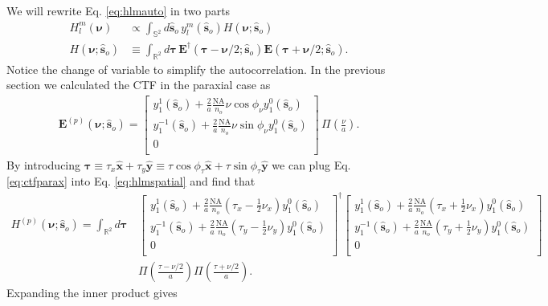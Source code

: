 \documentclass[11pt]{article}
\providecommand{\mb}[1]{\mathbf{#1}}
\providecommand{\so}[1]{\mathbf{\hat{s}}_o}
\providecommand{\mh}[1]{\mathbf{\hat{#1}}}
\providecommand{\bs}[1]{\boldsymbol{#1}}
\begin{document}
We will rewrite Eq. \ref{eq:hlmauto} in two parts
\begin{align}
  H_l^m(\bs{\nu}) &\propto \int_{\mathbb{S}^2}d\so{}\, y_l^m(\so{}) H(\bs{\nu}; \so{})  \label{eq:hlmauto2}\\
  H(\bs{\nu}; \so{}) &\equiv \int_{\mathbb{R}^2}d\bs{\tau}\,\mb{E}^{\dagger}(\bs{\tau}- \bs{\nu}/2; \so{})\mb{E}(\bs{\tau} + \bs{\nu}/2; \so{}). \label{eq:hlmspatial}
\end{align}
Notice the change of variable to simplify the autocorrelation. In the previous
section we calculated the CTF in the paraxial case as 
\begin{align}
  {\mb{E}}^{(p)}(\bs{\nu}; \so{}) =
\begin{bmatrix}
  y_1^1(\so{}) + \frac{2}{a}\frac{\text{NA}}{n_o}\nu\cos\phi_\nu y_1^0(\so{})\\
  y_1^{-1}(\so{}) + \frac{2}{a}\frac{\text{NA}}{n_o}\nu\sin\phi_\nu y_1^0(\so{})\\
  0\\
  \end{bmatrix}\, \Pi\left(\frac{\nu}{a}\right). \label{eq:ctfparax}
\end{align}
By introducing $\bs{\tau} \equiv \tau_x\mh{x} + \tau_y\mh{y} \equiv \tau\cos\phi_\tau\mh{x} + \tau\sin\phi_\tau\mh{y}$
we can plug Eq. \ref{eq:ctfparax} into Eq. \ref{eq:hlmspatial} and find that
\begin{align}
    H^{(p)}(\bs{\nu}; \so{}) = \int_{\mathbb{R}^2}d\bs{\tau}\, &\begin{bmatrix}
  y_1^1(\so{}) + \frac{2}{a}\frac{\text{NA}}{n_o}(\tau_x - \frac{1}{2}\nu_x) y_1^0(\so{})\\
  y_1^{-1}(\so{}) + \frac{2}{a}\frac{\text{NA}}{n_o}(\tau_y - \frac{1}{2}\nu_y) y_1^0(\so{})\\
  0\\
\end{bmatrix}^{\dagger}
  \begin{bmatrix}
  y_1^1(\so{}) + \frac{2}{a}\frac{\text{NA}}{n_o}(\tau_x + \frac{1}{2}\nu_x) y_1^0(\so{})\\
  y_1^{-1}(\so{}) + \frac{2}{a}\frac{\text{NA}}{n_o}(\tau_y + \frac{1}{2}\nu_y) y_1^0(\so{})\\
  0\\
\end{bmatrix}\nonumber \\
  &\Pi\left(\frac{\tau - \nu/2}{a}\right)\Pi\left(\frac{\tau + \nu/2}{a}\right).
\end{align}
Expanding the inner product gives
\end{document}
